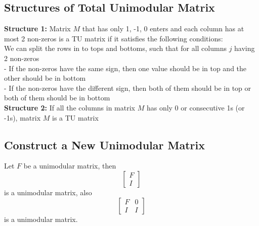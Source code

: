 			\subsection{Structures of Total Unimodular Matrix}
				\textbf{Structure 1:}
					Matrix $M$ that has only 1, -1, 0 enters and each column has at most 2 non-zeros is a TU matrix if it satisfies the following conditions:\\
					We can split the rows in to tops and bottoms, such that for all columns $j$ having 2 non-zeros\\
					- If the non-zeros have the same sign, then one value should be in top and the other should be in bottom\\
					- If the non-zeros have the different sign, then both of them should be in top or both of them should be in bottom\\
				\textbf{Structure 2:}
					If all the columns in matrix $M$ has only 0 or consecutive 1s (or -1s), matrix $M$ is a TU matrix

			\subsection{Construct a New Unimodular Matrix}
				Let $F$ be a unimodular matrix, then
				\begin{equation}
					\left[\begin{matrix}F \\ I\end{matrix}\right] 
				\end{equation}
				is a unimodular matrix, also
				\begin{equation}
					\left[\begin{matrix}F & 0 \\ I & I\end{matrix}\right] 
				\end{equation}
				is a unimodular matrix.
